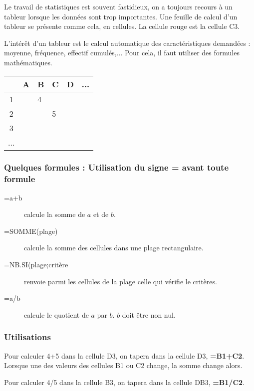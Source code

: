 
Le travail de statistiques est souvent fastidieux, on a toujours recours à un tableur lorsque les données sont trop importantes. Une feuille de calcul d'un tableur se présente comme cela, en cellules. La cellule rouge est la cellule C3.

L'intérêt d'un tableur est le calcul automatique des caractéristiques demandées : moyenne, fréquence, effectif cumulés,... Pour cela, il faut utiliser des formules mathématiques.

\vspace{0.4cm}

\begin{tabular}{|c|m{2cm}|m{2cm}|m{2cm}|m{2cm}|m{2cm}|}
\hline 
\rowcolor{gray} & A & B & C & D &...\\ 
\hline 
\cellcolor{gray}1 & &4 &  & &  \\ 
\hline 
\cellcolor{gray}2 & & & 5 & &   \\ 
\hline 
\cellcolor{gray}3 & & & \cellcolor{red} & &  \\ 
\hline 
\cellcolor{gray}... & & &  & & \\ 
\hline 
\end{tabular} 

\subsubsection*{Quelques formules : Utilisation du signe = avant toute formule}

\begin{description}
\item[=a+b] calcule la somme de  $a$ et de $b$. 
\item[=SOMME(plage)] calcule la somme des cellules dans une plage rectangulaire.
\item[=NB.SI(plage;critère] renvoie parmi les cellules de la plage celle qui vérifie le critères.
\item[=a/b] calcule le quotient de  $a$ par $b$. $b$ doit être non nul.
\end{description}

\subsubsection*{Utilisations}
\begin{description}[leftmargin=*]
\item Pour calculer 4+5 dans la cellule D3, on tapera dans la cellule D3, \textbf{=B1+C2}. Lorsque une des valeurs des cellules B1 ou C2 change, la somme change alors. 
\item Pour calculer 4/5 dans la cellule B3, on tapera dans la cellule DB3, \textbf{=B1/C2}. 
\end{description}


